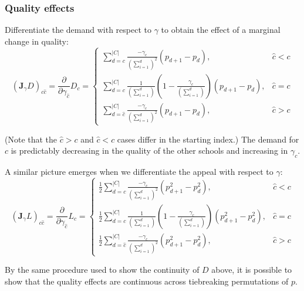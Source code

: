 \documentclass[12pt]{article}
\theoremstyle{definition}
\begin{document}
\subsubsection{Quality effects}
Differentiate the demand with respect to $\gamma$ to obtain the effect of a marginal change in quality:
\begin{equation}
\left(\mathbf{J}_\gamma D \right)_{c\hat c} =
\frac{\partial}{\partial\gamma_{\hat c}} D_c = \begin{cases}
\sum_{d=c}^{|C|} \frac{-\gamma_c}{\left(\sum_{i=1}^{d} \right)^2} \left(p_{d+1} - p_d \right), & \hat c < c \\
\sum_{d=c}^{|C|} \frac{1}{\left(\sum_{i=1}^{d} \right)}
    \left( 1 - \frac{\gamma_c}{\left(\sum_{i=1}^{d} \right)}\right)
    \left(p_{d+1} - p_d \right), & \hat c = c\\
\sum_{d=\hat c}^{|C|} \frac{-\gamma_c}{\left(\sum_{i=1}^{d} \right)^2} \left(p_{d+1} - p_d \right), & \hat c > c
\end{cases}
\end{equation}

(Note that the $\hat c > c$ and $ \hat c < c$ cases differ in the starting index.) The demand for $c$ is predictably decreasing in the quality of the other schools and increasing in $\gamma_c$. 

A similar picture emerges when we differentiate the appeal with respect to $\gamma$:
\begin{equation}
\left(\mathbf{J}_\gamma L \right)_{c\hat c} =
\frac{\partial}{\partial\gamma_{\hat c}} L_c = \begin{cases}
\frac{1}{2}\sum_{d=c}^{|C|} \frac{-\gamma_c}{\left(\sum_{i=1}^{d} \right)^2} \left(p_{d+1}^2 - p_d^2 \right), & \hat c < c \\
\frac{1}{2}\sum_{d=c}^{|C|} \frac{1}{\left(\sum_{i=1}^{d} \right)}
    \left( 1 - \frac{\gamma_c}{\left(\sum_{i=1}^{d} \right)}\right)
    \left(p_{d+1}^2 - p_d^2 \right), & \hat c = c\\
\frac{1}{2}\sum_{d=\hat c}^{|C|} \frac{-\gamma_c}{\left(\sum_{i=1}^{d} \right)^2} \left(p_{d+1}^2 - p_d^2 \right), & \hat c > c
\end{cases}\end{equation}

By the same procedure used to show the continuity of $D$ above, it is possible to show that the quality effects are continuous across tiebreaking permutations of $p$.
\end{document}

